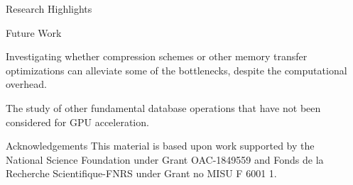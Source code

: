 \documentclass[final]{beamer}
\newlength{\sepwidth}
\newlength{\colwidth}
\newcommand{\separatorcolumn}{\begin{column}{\sepwidth}\end{column}}
\begin{document}
\begin{frame}[t]
\begin{columns}[t]
\begin{column}{\colwidth}
\begin{block}{Research Highlights}
\end{block} 






\begin{block}{Future Work}



\begin{description}[font=$\bullet$~\normalfont\scshape\color{red!50!black}]

\item Investigating whether compression schemes or other memory transfer optimizations can alleviate some of the bottlenecks, despite the computational overhead.

\item The study of other fundamental database operations that have not been considered for GPU acceleration.


\end{description}






\end{block}
\begin{block}{Acknowledgements}
This material is based upon work supported by the National Science Foundation under Grant OAC-1849559 and Fonds de la Recherche Scientifique-FNRS under Grant no MISU F 6001 1.
\end{block}



\end{column}

\separatorcolumn
\end{columns}
\end{frame}
\end{document}
